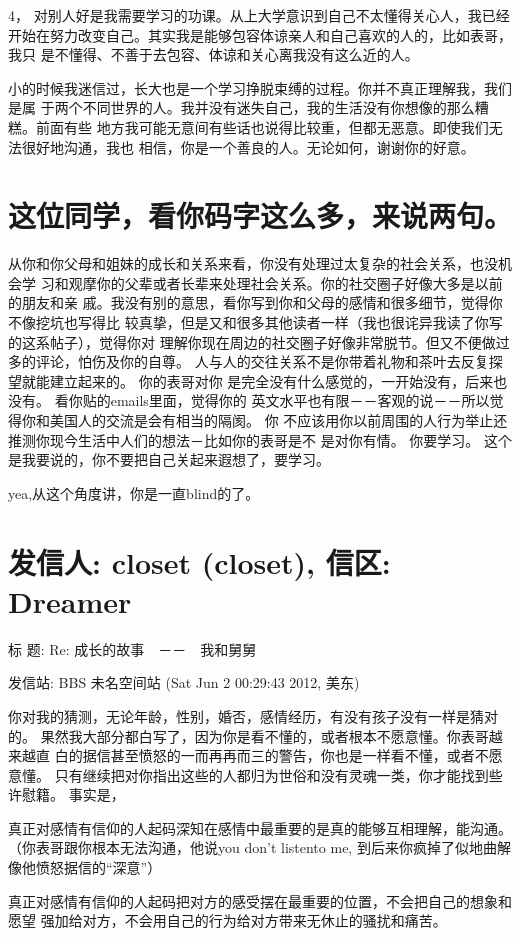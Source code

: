 \documentclass[12pt]{book}
\begin{document}
4，    对别人好是我需要学习的功课。从上大学意识到自己不太懂得关心人，我已经
开始在努力改变自己。其实我是能够包容体谅亲人和自己喜欢的人的，比如表哥，我只
是不懂得、不善于去包容、体谅和关心离我没有这么近的人。

小的时候我迷信过，长大也是一个学习挣脱束缚的过程。你并不真正理解我，我们是属
于两个不同世界的人。我并没有迷失自己，我的生活没有你想像的那么糟糕。前面有些
地方我可能无意间有些话也说得比较重，但都无恶意。即使我们无法很好地沟通，我也
相信，你是一个善良的人。无论如何，谢谢你的好意。
\section{这位同学，看你码字这么多，来说两句。}
\label{sec-9-66}
从你和你父母和姐妹的成长和关系来看，你没有处理过太复杂的社会关系，也没机会学
习和观摩你的父辈或者长辈来处理社会关系。你的社交圈子好像大多是以前的朋友和亲
戚。我没有别的意思，看你写到你和父母的感情和很多细节，觉得你不像挖坑也写得比
较真挚，但是又和很多其他读者一样（我也很诧异我读了你写的这系帖子），觉得你对
理解你现在周边的社交圈子好像非常脱节。但又不便做过多的评论，怕伤及你的自尊。
人与人的交往关系不是你带着礼物和茶叶去反复探望就能建立起来的。 你的表哥对你
是完全没有什么感觉的，一开始没有，后来也没有。 看你贴的emails里面，觉得你的
英文水平也有限－－客观的说－－所以觉得你和美国人的交流是会有相当的隔阂。 你
不应该用你以前周围的人行为举止还推测你现今生活中人们的想法－比如你的表哥是不
是对你有情。 你要学习。 这个是我要说的，你不要把自己关起来遐想了，要学习。

yea,从这个角度讲，你是一直blind的了。
\section{发信人: closet (closet), 信区: Dreamer}
\label{sec-9-67}
标  题: Re: 成长的故事　－－　我和舅舅

发信站: BBS 未名空间站 (Sat Jun  2 00:29:43 2012, 美东)

你对我的猜测，无论年龄，性别，婚否，感情经历，有没有孩子没有一样是猜对的。
果然我大部分都白写了，因为你是看不懂的，或者根本不愿意懂。你表哥越来越直
白的据信甚至愤怒的一而再再而三的警告，你也是一样看不懂，或者不愿意懂。
只有继续把对你指出这些的人都归为世俗和没有灵魂一类，你才能找到些许慰籍。
事实是，

真正对感情有信仰的人起码深知在感情中最重要的是真的能够互相理解，能沟通。
（你表哥跟你根本无法沟通，他说you don't listento me, 到后来你疯掉了似地曲解
像他愤怒据信的“深意”）

真正对感情有信仰的人起码把对方的感受摆在最重要的位置，不会把自己的想象和愿望
强加给对方，不会用自己的行为给对方带来无休止的骚扰和痛苦。
\end{document}
